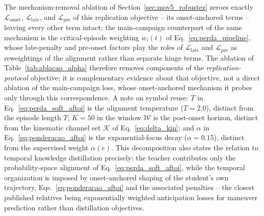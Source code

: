 \documentclass[a4paper,fleqn]{cas-dc}
\begin{document}
{The mechanism-removal ablation
of Section~\ref{sec:mov5_robustez} zeroes exactly
$\mathcal{L}_{\text{onset}}$, $\mathcal{L}_{\text{late}}$, and
$\mathcal{L}_{\text{pre}}$ of this replication objective -- its onset-anchored
terms -- leaving every other term intact; the main-campaign counterpart of the
same mechanism is the critical-episode weighting $w_i(t)$ of
Eq.~\ref{eq:perda_pipeline}, whose late-penalty and pre-onset factors play the
roles of $\mathcal{L}_{\text{late}}$ and $\mathcal{L}_{\text{pre}}$ as
reweightings of the alignment rather than separate hinge terms. The ablation
of Table~\ref{tab:ablacao_alpha} therefore removes components of the
\emph{replication-protocol} objective: it is complementary evidence about
that objective, not a direct ablation of the main-campaign loss, whose
onset-anchored mechanism it probes only through this correspondence. A note on symbol reuse: $T$ in Eq.~\ref{eq:perda_soft_aftoi} is
the alignment temperature ($T{=}2.0$), distinct from the episode length $T$;
$K{=}50$ in the window $\mathcal{W}$ is the post-onset horizon, distinct from
the kinematic channel set $\mathcal{K}$ of Eq.~\ref{eq:delta_kin}; and
$\alpha$ in Eq.~\ref{eq:ponderacao_aftoi} is the exponential-focus decay
($\alpha{=}0.15$), distinct from the supervised weight $\alpha(e)$. This decomposition also states the relation to temporal knowledge
distillation precisely: the teacher contributes only the probability-space
alignment of Eq.~\ref{eq:perda_soft_aftoi}, while the temporal organization is
imposed by onset-anchored shaping of the student's own trajectory,
Eqs.~\ref{eq:ponderacao_aftoi} and the associated penalties -- the closest
published relatives being exponentially weighted anticipation losses for
maneuver prediction rather than distillation objectives.}
\end{document}

